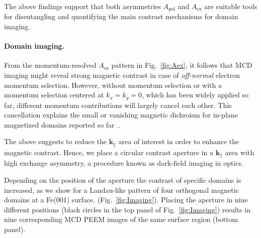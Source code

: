 \documentclass[prl,twocolumn,floatfix,superscriptaddress]{revtex4-2}
\renewcommand{\vec}[1]{\boldsymbol{#1}}
\begin{document}
The above findings support that both asymmetries $A_{\mathrm{pol}}$ and $A_{\mathrm{ex}}$ are suitable tools for disentangling and quantifying the main contrast mechanisms for domain imaging. 

\paragraph{Domain imaging.} From the momentum-resolved $A_{\mathrm{ex}}$ pattern in Fig.~\ref{fig:Aex}, it follows that MCD imaging might reveal strong magnetic contrast in case of \emph{off-normal} electron momentum selection. However, without momentum selection or with a momentum selection centered at $k_x = k_y = 0$, which has been widely applied so far, different momentum contributions will largely cancel each other. This cancellation explains the small or vanishing magnetic dichroism for in-plane magnetized domains reported so far~\cite{marx2000}.

The above suggests to reduce the $\vec{k}_{\parallel}$ area of interest in order to enhance the magnetic contrast. Hence, we place a circular contrast aperture in a $\vec{k}_{\parallel}$ area with high exchange asymmetry, a procedure known as dark-field imaging in optics. 

Depending on the position of the aperture the contrast of specific domains is increased, as we show for a Landau-like pattern of four orthogonal magnetic domains at a Fe(001) surface. (Fig.~\ref{fig:Imaging}). Placing the aperture in nine different positions (black circles in the top panel of Fig.~\ref{fig:Imaging})  results in nine corresponding MCD PEEM images of the same surface region (bottom panel). 
\end{document}
